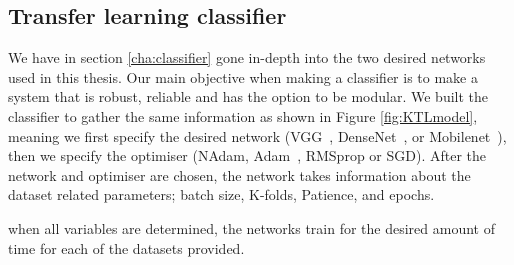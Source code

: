 \subsection{Transfer learning classifier}
We have in section \ref{cha:classifier} gone in-depth into the two desired networks used in this thesis.  Our main objective when making a classifier is to make a system that is robust, reliable and has the option to be modular. 
We built the classifier to gather the same information as shown in Figure \ref{fig:KTLmodel}, meaning we first specify the desired network (VGG~\cite{simonyan2014very}, DenseNet~\cite{DBLP:journals/corr/HuangLW16a}, or Mobilenet~\cite{DBLP:journals/corr/HowardZCKWWAA17}), then we specify the optimiser (NAdam, Adam~\cite{adam}, RMSprop or SGD).
After the network and optimiser are chosen, the network takes information about the dataset related parameters; batch size, K-folds, Patience, and epochs.

when all variables are determined, the networks train for the desired amount of time for each of the datasets provided.

